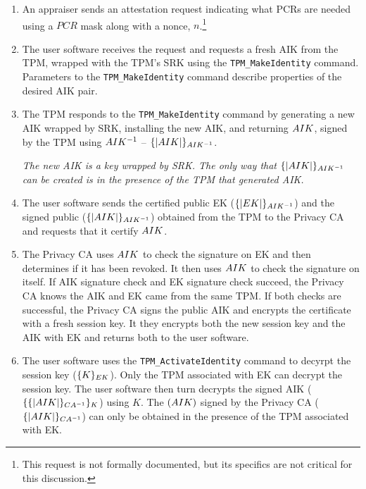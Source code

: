 \documentclass[10pt]{article}
\begin{document}
\begin{enumerate}
  \parskip=0pt\itemsep=0pt
\item An appraiser sends an attestation request indicating what PCRs
  are needed using a $PCR$ mask along with a nonce, $n$.\footnote{This
  request is not formally documented, but its specifics are not
  critical for this discussion.}

\item The user software receives the request and requests a fresh AIK
  from the TPM, wrapped with the TPM's SRK using the
  \verb+TPM_MakeIdentity+ command.  Parameters to the
  \verb+TPM_MakeIdentity+ command describe properties of the desired
  AIK pair.

\item The TPM responds to the \verb+TPM_MakeIdentity+ command by
  generating a new AIK wrapped by SRK, installing the new AIK, and
  returning $AIK$, signed by the TPM using $AIK^{-1}$ --
  $\{|AIK|\}_{AIK^{-1}}$.

  \emph{The new AIK is a key wrapped by SRK.  The only way that
    $\{|AIK|\}_{AIK^{-1}}$ can be created is in the presence of
    the TPM that generated AIK.}

\item The user software sends the certified public EK
  ($\{|EK|\}_{AIK^{-1}}$) and the signed public 
  ($\{|AIK|\}_{AIK^{-1}}$) obtained from the TPM to the Privacy CA and
  requests that it certify $AIK$.

\item The Privacy CA uses $AIK$ to check the signature on EK
  and then determines if it has been revoked.  It then uses
  $AIK$ to check the signature on itself.  If AIK signature
  check and EK signature check succeed, the Privacy CA knows the AIK
  and EK came from the same TPM.  If both checks are successful, the
  Privacy CA signs the public AIK and encrypts the certificate with a
  fresh session key.  It they encrypts both the new session key and
  the AIK with EK and returns both to the user software.

\item The user software uses the \verb+TPM_ActivateIdentity+ command
  to decyrpt the session key ($\{K\}_{EK}$).  Only the TPM
  associated with EK can decrypt the session key.  The user software
  then turn decrypts the signed AIK ($\{\{|AIK|\}_{CA^{-1}}\}_{K}$)
  using $K$.  The $(AIK)$ signed by the Privacy CA
  ($\{|AIK|\}_{CA^{-1}}$) can only be obtained in the presence of
  the TPM associated with EK.


\end{enumerate}
\end{document}
